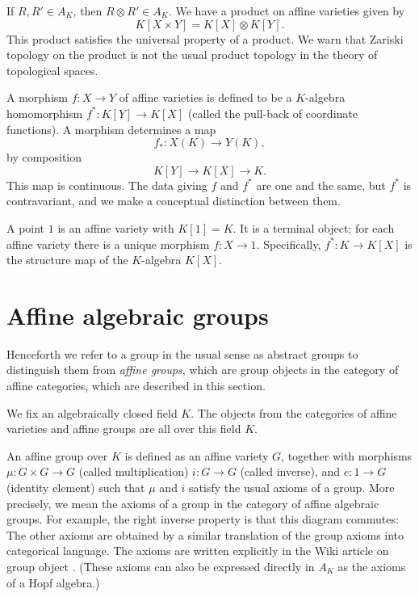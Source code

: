 If $R,R'\in A_K$, then $R\otimes R'\in A_K$.  We have a product on
affine varieties given by
\[
K[X \times Y] = K[X]\otimes K[Y].
\]
This product satisfies the universal property of a product.  We warn
that Zariski topology on the product is not the usual product topology
in the theory of topological spaces.

A morphism $f:X \to Y$ of affine varieties is defined to be a
$K$-algebra homomorphism $f^*:K[Y]\to K[X]$ (called the pull-back of
coordinate functions).  A morphism determines a map
\[
f_*: X(K) \to Y(K),
\]
by composition
\[
K[Y] \to K[X] \to K.
\]
This map is continuous.  The data giving $f$ and $f^*$ are one and the
same, but $f^*$ is contravariant, and we make a conceptual distinction
between them.

A point $1$ is an affine variety with $K[1]=K$.  It is a terminal
object; for each affine variety there is a unique morphism $f:X\to 1$.
Specifically, $f^*:K\to K[X]$ is the structure map of the $K$-algebra
$K[X]$.


\section{Affine algebraic groups}

Henceforth we refer to a group in the usual sense as abstract groups
to distinguish them from {\it affine groups}, which are group objects
in the category of affine categories, which are described in this
section.

We fix an algebraically closed field $K$.  The objects from the
categories of affine varieties and affine groups are all over this
field $K$.

An affine group over $K$ is defined as an affine variety
$G$, together with morphisms $\mu:G \times G \to G$ (called
multiplication) $i:G \to G$ (called inverse), and $e:1\to G$ (identity
element) such that $\mu$ and $i$ satisfy the usual axioms of a
group. More precisely, we mean the axioms of a group in the category
of affine algebraic groups.  For example, the right inverse property
is that this diagram commutes:
\[
\]
The other axioms are obtained by a similar translation of the group
axioms into categorical language.  The axioms are written explicitly
in the Wiki article on group object \cite{group-object}.  (These
axioms can also be expressed directly in $A_K$ as the axioms of a Hopf
algebra.)

